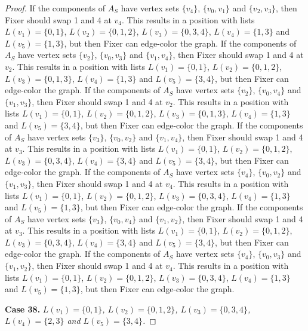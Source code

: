 \documentclass[12pt]{amsart}
\theoremstyle{plain}
\theoremstyle{definition}
\theoremstyle{remark}
\begin{document}
\begin{proof}
If the components of $A_S$ have vertex sets $\{v_4\}$, $\{v_0, v_1\}$ and $\{v_2, v_3\}$, then Fixer should swap 1 and 4 at $v_4$. This results in a position with lists $L(v_1) = \{0, 1\}$, $L(v_2) = \{0, 1, 2\}$, $L(v_3) = \{0, 3, 4\}$, $L(v_4) = \{1, 3\}$ and $L(v_5) = \{1, 3\}$, but then Fixer can edge-color the graph.
If the components of $A_S$ have vertex sets $\{v_2\}$, $\{v_0, v_3\}$ and $\{v_1, v_4\}$, then Fixer should swap 1 and 4 at $v_2$. This results in a position with lists $L(v_1) = \{0, 1\}$, $L(v_2) = \{0, 1, 2\}$, $L(v_3) = \{0, 1, 3\}$, $L(v_4) = \{1, 3\}$ and $L(v_5) = \{3, 4\}$, but then Fixer can edge-color the graph.
If the components of $A_S$ have vertex sets $\{v_2\}$, $\{v_0, v_4\}$ and $\{v_1, v_3\}$, then Fixer should swap 1 and 4 at $v_2$. This results in a position with lists $L(v_1) = \{0, 1\}$, $L(v_2) = \{0, 1, 2\}$, $L(v_3) = \{0, 1, 3\}$, $L(v_4) = \{1, 3\}$ and $L(v_5) = \{3, 4\}$, but then Fixer can edge-color the graph.
If the components of $A_S$ have vertex sets $\{v_3\}$, $\{v_0, v_2\}$ and $\{v_1, v_4\}$, then Fixer should swap 1 and 4 at $v_3$. This results in a position with lists $L(v_1) = \{0, 1\}$, $L(v_2) = \{0, 1, 2\}$, $L(v_3) = \{0, 3, 4\}$, $L(v_4) = \{3, 4\}$ and $L(v_5) = \{3, 4\}$, but then Fixer can edge-color the graph.
If the components of $A_S$ have vertex sets $\{v_4\}$, $\{v_0, v_2\}$ and $\{v_1, v_3\}$, then Fixer should swap 1 and 4 at $v_4$. This results in a position with lists $L(v_1) = \{0, 1\}$, $L(v_2) = \{0, 1, 2\}$, $L(v_3) = \{0, 3, 4\}$, $L(v_4) = \{1, 3\}$ and $L(v_5) = \{1, 3\}$, but then Fixer can edge-color the graph.
If the components of $A_S$ have vertex sets $\{v_3\}$, $\{v_0, v_4\}$ and $\{v_1, v_2\}$, then Fixer should swap 1 and 4 at $v_3$. This results in a position with lists $L(v_1) = \{0, 1\}$, $L(v_2) = \{0, 1, 2\}$, $L(v_3) = \{0, 3, 4\}$, $L(v_4) = \{3, 4\}$ and $L(v_5) = \{3, 4\}$, but then Fixer can edge-color the graph.
If the components of $A_S$ have vertex sets $\{v_4\}$, $\{v_0, v_3\}$ and $\{v_1, v_2\}$, then Fixer should swap 1 and 4 at $v_4$. This results in a position with lists $L(v_1) = \{0, 1\}$, $L(v_2) = \{0, 1, 2\}$, $L(v_3) = \{0, 3, 4\}$, $L(v_4) = \{1, 3\}$ and $L(v_5) = \{1, 3\}$, but then Fixer can edge-color the graph.

\noindent\textbf{Case 38.  }\textit{$L(v_1) = \{0, 1\}$, $L(v_2) = \{0, 1, 2\}$, $L(v_3) = \{0, 3, 4\}$, $L(v_4) = \{2, 3\}$ and $L(v_5) = \{3, 4\}$.}


\end{proof}
\end{document}
